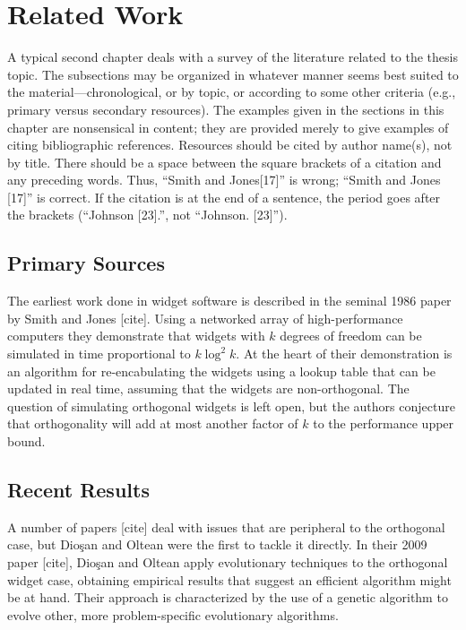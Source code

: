 %
%
\chapter{Related Work}\label{ch:relatedwork}

A typical second chapter deals with a survey of the literature
related to the thesis topic. The subsections may be organized in whatever
manner seems best suited to the material---chronological, or by topic, or
according to some other criteria (e.g., primary versus secondary resources).
The examples given in the sections in this chapter are nonsensical in content;
they are provided merely to give examples of citing bibliographic references.
Resources should be cited by author name(s), not by title.
There should be a space between the square brackets of a citation and
any preceding words. Thus, ``Smith and Jones[17]'' is wrong; ``Smith and
Jones [17]'' is correct. If the citation is at the end of a sentence, the
period goes after the brackets (``Johnson [23].'', not ``Johnson. [23]'').

\section{Primary Sources}
The earliest work done in widget software is described in the seminal 1986
paper by Smith and Jones [cite]. Using a networked array of
high-performance computers they demonstrate that widgets with $k$ degrees
of freedom can be simulated in time proportional to $k\log^2k$. At the
heart of their demonstration is an algorithm for re-encabulating the widgets
using a lookup table that can be updated in real time, assuming that
the widgets are non-orthogonal. The question of simulating orthogonal widgets
is left open, but the authors conjecture that orthogonality will add at
most another factor of $k$ to the performance upper bound.


\section{Recent Results}
A number of papers [cite] deal with issues
that are peripheral to the orthogonal case, but Dio\c{s}an and Oltean
were the first to tackle it directly.
In their 2009 paper [cite],
Dio\c{s}an and Oltean apply evolutionary techniques to
the orthogonal widget case, obtaining empirical results that suggest
an efficient algorithm might be at hand. Their
approach is characterized by the use of a genetic algorithm to evolve other,
more problem-specific evolutionary algorithms.
